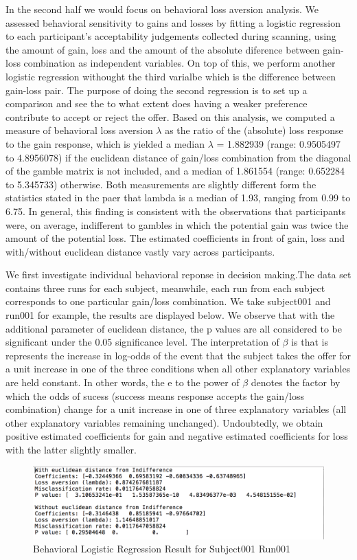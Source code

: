\par \indent In the second half we would focus on behavioral loss aversion
analysis. We assessed behavioral sensitivity to gains and losses by fitting a
logistic regression to each participant's acceptability judgements collected 
during scanning, using the amount of gain, loss and the amount of the absolute 
diference between gain-loss combination as independent variables. On top of
this, we perform another logistic regression withought the third varialbe which 
is the difference between gain-loss pair. The purpose of doing the second
regression is to set up a comparison and see the to what extent does  having a 
weaker preference contribute to accept or reject the offer. Based on this 
analysis, we computed a measure of behavioral loss aversion $\lambda$ as the ratio
of the (absolute) loss response to the gain response, which is yielded a median
$\lambda$ = 1.882939 (range: 0.9505497 to 4.8956078) if the euclidean distance of 
gain/loss combination from the diagonal of the gamble matrix is not included, 
and a median of 1.861554 (range: 0.652284 to 5.345733) otherwise. Both
measurements are slightly different form the statistics stated in the paer that
lambda is a median of 1.93, ranging from 0.99 to 6.75. In general, this finding
is consistent with the observations that participants were, on average,
indifferent to gambles in which the potential gain was twice the amount of the 
potential loss. The estimated coefficients in front of gain, loss and 
with/without euclidean distance vastly vary across participants. 
    
\par \indent We first investigate individual behavioral reponse in decision 
making.The data set contains three runs for each subject, meanwhile, each run 
from each subject corresponds to one particular gain/loss combination. We take 
subject001 and run001 for example, the results are displayed below. We observe 
that with the additional parameter of euclidean distance, the p values are all 
considered
to be significant under the 0.05 significance level. The interpretation of $\beta$
is that is represents the increase in log-odds of the event that the subject 
takes the offer for a unit increase in one of the three conditions when all 
other explanatory variables are held constant. In other words, the e to the 
power of $\beta$ denotes the factor by which the odds of sucess (success means
response accepts the gain/loss combination) change for a unit increase in one
of three explanatory variables (all other explanatory variables remaining 
unchanged). Undoubtedly, we obtain positive estimated coefficients for gain and
negative estimated coefficients for loss with the latter slightly smaller. 

\begin {figure}[!ht]
\centering
\includegraphics[width=120mm]{images/Sub001Run001.png}
\caption{Behavioral Logistic Regression Result for Subject001 Run001}
\label{fig:Logistic Regression}
\end{figure}

